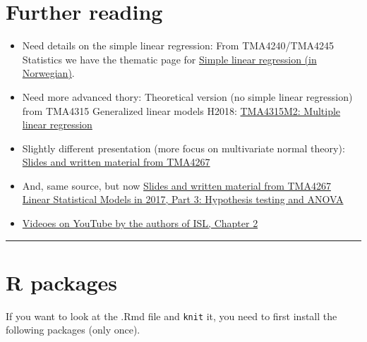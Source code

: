 \documentclass[]{article}
\providecommand{\tightlist}{%
  \setlength{\itemsep}{0pt}\setlength{\parskip}{0pt}}
\begin{document}
\section{ Further reading }\label{further-reading}

\begin{itemize}
\tightlist
\item
  Need details on the simple linear regression: From TMA4240/TMA4245
  Statistics we have the thematic page for
  \href{https://wiki.math.ntnu.no/tma4245/tema/begreper/regression}{Simple
  linear regression (in Norwegian)}.
\item
  Need more advanced thory: Theoretical version (no simple linear
  regression) from TMA4315 Generalized linear models H2018:
  \href{https://www.math.ntnu.no/emner/TMA4315/2018h/2MLR.html}{TMA4315M2:
  Multiple linear regression}
\item
  Slightly different presentation (more focus on multivariate normal
  theory):
  \href{https://www.math.ntnu.no/emner/TMA4267/2017v/TMA4267V2017Part2.pdf}{Slides
  and written material from TMA4267}
\item
  And, same source, but now
  \href{http://www.math.ntnu.no/emner/TMA4267/2017v/TMA4267V2017Part3.pdf}{Slides
  and written material from TMA4267 Linear Statistical Models in 2017,
  Part 3: Hypothesis testing and ANOVA}
\item
  \href{https://www.youtube.com/playlist?list=PL5-da3qGB5IBSSCPANhTgrw82ws7w_or9}{Videoes
  on YouTube by the authors of ISL, Chapter 2}
\end{itemize}

\begin{center}\rule{0.5\linewidth}{\linethickness}\end{center}

\section{ R packages}\label{r-packages}

If you want to look at the .Rmd file and \texttt{knit} it, you need to
first install the following packages (only once).
\end{document}
